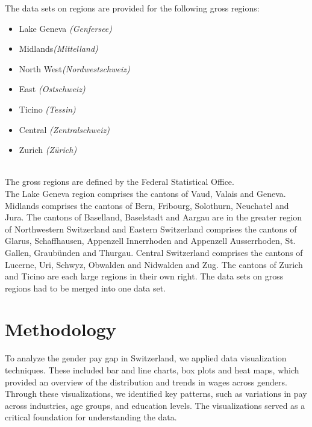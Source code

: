 \documentclass{article}
\begin{document}
The data sets on regions are provided for the following gross regions:
     \begin{itemize}
        \item Lake Geneva \textit{(Genfersee)}
        \item Midlands\textit{(Mittelland)}
        \item North West\textit{(Nordwestschweiz)}
        \item East \textit{(Ostschweiz)}
        \item Ticino \textit{(Tessin)}
        \item Central \textit{(Zentralschweiz)}
        \item Zurich \textit{(Zürich)}
    \end{itemize}
\\

The gross regions are defined by the Federal Statistical Office.\cite{1} \\
The Lake Geneva region comprises the cantons of Vaud, Valais and Geneva. Midlands comprises the cantons of Bern, Fribourg, Solothurn, Neuchatel and Jura. The cantons of Baselland, Baselstadt and Aargau are in the greater region of Northwestern Switzerland and Eastern Switzerland comprises the cantons of Glarus, Schaffhausen, Appenzell Innerrhoden and Appenzell Ausserrhoden, St. Gallen, Graubünden and Thurgau. Central Switzerland comprises the cantons of Lucerne, Uri, Schwyz, Obwalden and Nidwalden and Zug. The cantons of Zurich and Ticino are each large regions in their own right. The data sets on gross regions had to be merged into one data set.

\section{Methodology}

To analyze the gender pay gap in Switzerland, we applied data visualization techniques. These included bar and line charts, box plots and heat maps, which provided an overview of the distribution and trends in wages across genders. Through these visualizations, we identified key patterns, such as variations in pay across industries, age groups, and education levels. The visualizations served as a critical foundation for understanding the data.\\
\end{document}
